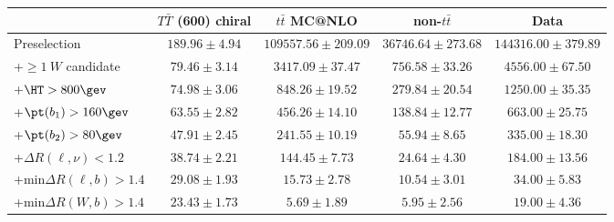 \begin{tabular}{l c c c c } \toprule\toprule
 & $T\bar{T}$ (600) chiral 		 & $t\bar{t}$ MC@NLO 		 & non-$t\bar{t}$ 		 & Data 		 \\ \midrule 
  Preselection  & $189.96 \pm 4.94$  & $109557.56 \pm 209.09$  & $36746.64 \pm 273.68$  & $144316.00 \pm 379.89$ \\ 
 +$\geq 1~W$ candidate  & $79.46 \pm 3.14$  & $3417.09 \pm 37.47$  & $756.58 \pm 33.26$  & $4556.00 \pm 67.50$ \\ 
 +$\HT>800\gev$  & $74.98 \pm 3.06$  & $848.26 \pm 19.52$  & $279.84 \pm 20.54$  & $1250.00 \pm 35.35$ \\ 
 +$\pt(b_1) > 160\gev$  & $63.55 \pm 2.82$  & $456.26 \pm 14.10$  & $138.84 \pm 12.77$  & $663.00 \pm 25.75$ \\ 
 +$\pt(b_2) >80\gev$  & $47.91 \pm 2.45$  & $241.55 \pm 10.19$  & $55.94 \pm 8.65$  & $335.00 \pm 18.30$ \\ 
 +$\Delta R(\ell,\nu)<1.2$  & $38.74 \pm 2.21$  & $144.45 \pm 7.73$  & $24.64 \pm 4.30$  & $184.00 \pm 13.56$ \\ 
 +min$\Delta R(\ell,b)>1.4$  & $29.08 \pm 1.93$  & $15.73 \pm 2.78$  & $10.54 \pm 3.01$  & $34.00 \pm 5.83$ \\ 
 +min$\Delta R(W,b)>1.4$  & $23.43 \pm 1.73$  & $5.69 \pm 1.89$  & $5.95 \pm 2.56$  & $19.00 \pm 4.36$ \\ 
\bottomrule\end{tabular}
